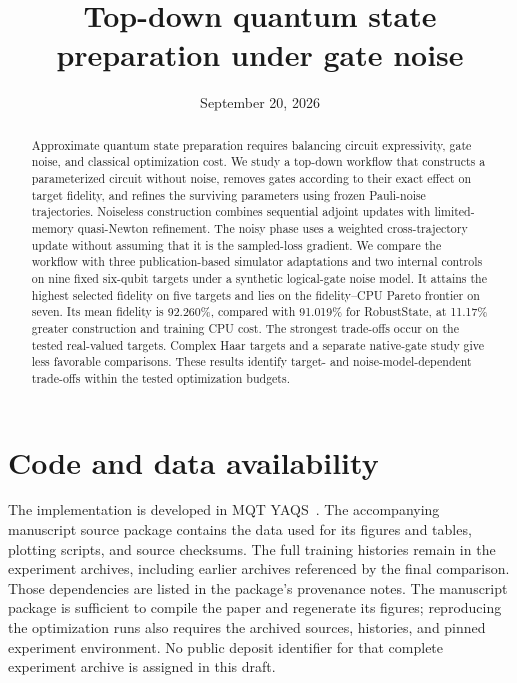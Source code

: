 \documentclass[aps,pra,10pt,twocolumn,superscriptaddress]{revtex4-2}
\begin{document}
\title{Top-down quantum state preparation under gate noise}

\date{September 20, 2026}

\begin{abstract}
Approximate quantum state preparation requires balancing circuit expressivity,
gate noise, and classical optimization cost. We study a top-down workflow that
constructs a parameterized circuit without noise, removes gates according to
their exact effect on target fidelity, and refines the surviving parameters
using frozen Pauli-noise trajectories. Noiseless construction combines
sequential adjoint updates with limited-memory quasi-Newton refinement. The
noisy phase uses a weighted cross-trajectory update without assuming that it
is the sampled-loss gradient. We compare the workflow with
three publication-based simulator adaptations and two internal controls on
nine fixed six-qubit targets under a synthetic logical-gate noise model. It
attains the highest selected fidelity on five targets and lies on the
fidelity--CPU Pareto frontier on seven. Its mean fidelity is 92.260\%, compared
with 91.019\% for RobustState, at 11.17\% greater construction and training CPU
cost. The strongest trade-offs occur on the tested real-valued targets.
Complex Haar targets and a separate native-gate study give less favorable
comparisons. These results identify target- and noise-model-dependent
trade-offs within the tested optimization budgets.
\end{abstract}

\maketitle








\section*{Code and data availability}
The implementation is developed in MQT YAQS~\cite{YAQS,Will2024MQT}.
The accompanying manuscript source package contains the data used for its
figures and tables, plotting scripts, and source checksums. The full training
histories remain in the experiment archives, including earlier archives
referenced by the final comparison. Those dependencies are listed in the
package's provenance notes. The manuscript package is sufficient to compile
the paper and regenerate its figures; reproducing the optimization runs also
requires the archived sources, histories, and pinned experiment environment.
No public deposit identifier for that complete experiment archive is assigned
in this draft.



\appendix


\end{document}
